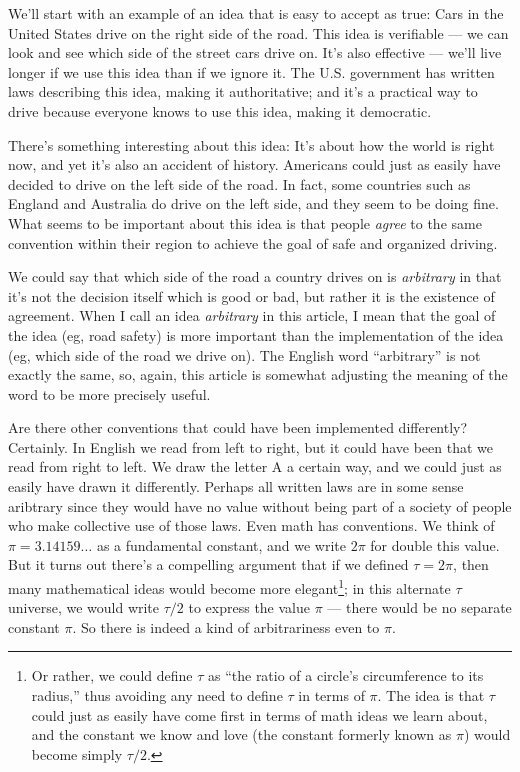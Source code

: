 \documentclass[11pt, oneside]{article}   	%
\begin{document}
We'll start with an example of an
idea that is easy to accept as true:
Cars in the United States drive on the right side of the road.
This idea is verifiable --- we can look and see which side of the street cars
drive on.
It's also effective --- we'll live
longer if we use this idea than if we ignore it.
The U.S.
government has written laws describing this idea, making it authoritative;
and it's a practical
way to drive
because everyone knows to use this idea, making it democratic.

There's something interesting about this idea: It's about how the world
is right now, and yet it's also an accident of history. Americans could just as
easily have decided to drive on the left side of the road. In fact,
some countries such as England and Australia do drive on the left side, and they
seem to be doing fine. What seems to be important about this idea is that people
{\em agree} to the same convention within their region to achieve the goal of
safe and organized driving.

We could say that which side of the road a country drives on is {\em arbitrary}
in that it's not the decision itself which is good or bad, but rather it is the
existence of agreement.
When I call an idea {\em arbitrary}
in this article, I mean that the goal of the idea (eg, road safety) is more
important than the implementation of the idea (eg, which side of the road we
drive on). The English word ``arbitrary'' is not exactly the same, so, again,
this article is somewhat adjusting the meaning of the word to be more precisely
useful.

Are there other conventions that could have been implemented differently?
Certainly. In English we read from left to right, but it could have been that we
read from right to left. We draw the letter A a certain way, and we could just
as easily have drawn it differently. Perhaps all written laws are in some sense
aribtrary since they would have no value without being part of a society of
people who make collective use of those laws. Even math has conventions. We
think of $\pi=3.14159\ldots$ as a fundamental constant, and we write $2\pi$ for
double this value. But it turns out there's a compelling argument
that if we defined $\tau=2\pi$,
then many mathematical ideas would become more elegant\footnote{Or
rather, we could define $\tau$ as
``the ratio of a circle's circumference to its radius,'' thus avoiding any need
to define $\tau$ in terms of $\pi$. The idea is that $\tau$ could just
as easily have
come first in terms of math ideas we learn about, and the constant
we know and love (the constant formerly known as $\pi$)
would become simply $\tau/2$.};
in this alternate $\tau$ universe, we would write $\tau/2$ to express the value
$\pi$ --- there would be no separate constant $\pi$.
So there is indeed a
kind of arbitrariness even to $\pi$.
\end{document}
